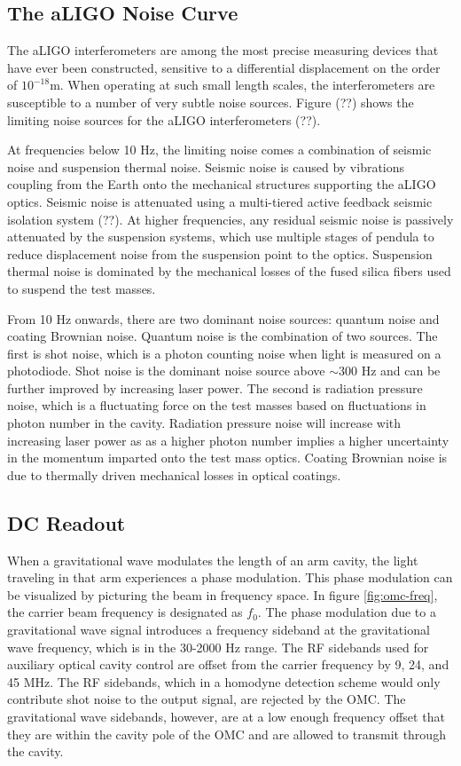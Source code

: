 \subsection{The aLIGO Noise Curve}

The aLIGO interferometers are among the most precise measuring devices 
that have ever been constructed, sensitive to a differential displacement 
on the order of $10^{-18}$m. When operating at such small length scales, 
the interferometers are susceptible to a number of very subtle noise sources. 
Figure (??) shows the limiting noise sources for the aLIGO interferometers (??). 

At frequencies below 10 Hz, the limiting noise comes a combination of seismic 
noise and suspension thermal noise. Seismic noise is caused by vibrations coupling 
from the Earth onto the mechanical structures supporting the aLIGO optics. 
Seismic noise is attenuated using 
a multi-tiered active feedback seismic isolation system (??). At higher 
frequencies, any residual seismic noise is passively attenuated by the 
suspension systems, which use multiple stages of pendula to reduce displacement noise 
from the suspension point to the optics.
Suspension thermal noise is dominated by the mechanical losses of the fused 
silica fibers used to suspend the test masses. 

From 10 Hz onwards, there are two dominant noise sources: quantum noise 
and coating Brownian noise. Quantum noise is the combination of two sources. 
The first is shot noise, which is a photon counting noise when light is measured 
on a photodiode. Shot noise is the dominant noise source above $\sim$300 Hz and 
can be further improved by increasing laser power. 
The second is radiation pressure noise, which is a fluctuating 
force on the test masses based on fluctuations in photon number in the cavity. 
Radiation pressure noise will increase with increasing laser power as 
as a higher photon number implies a higher uncertainty in the momentum 
imparted onto the test mass optics.
Coating Brownian noise is due to thermally driven mechanical losses in optical 
coatings. 

\subsection{DC Readout}

When a gravitational wave modulates the length of an arm cavity, the light 
traveling in that arm experiences a phase modulation. This phase modulation 
can be visualized by picturing the beam in frequency space. In figure 
\ref{fig:omc-freq}, the carrier beam frequency is designated as $f_0$. 
The phase modulation due to 
a gravitational wave signal introduces a frequency sideband at the 
gravitational wave frequency, which is in the 30-2000 Hz range. 
The 
RF sidebands used for auxiliary optical cavity control are offset from the 
carrier frequency by 9, 24, and 45 MHz. 
The RF sidebands, which in a 
homodyne detection scheme would only contribute shot noise to the output signal, 
are rejected by the OMC. The gravitational wave sidebands, however, are at a 
low enough frequency offset that they are within the cavity pole of the OMC 
and are allowed to transmit through the cavity.

